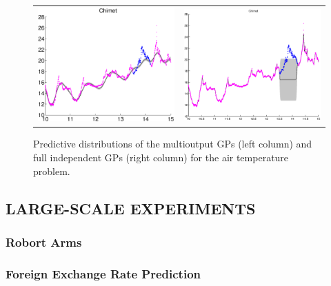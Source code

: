 \begin{figure}
\begin{tabular}{cc}
\includegraphics[scale=0.3]{figures/slfm-weatherChimet.eps} &
\includegraphics[scale=0.3]{figures/weatherChimet.eps}
\end{tabular}
\caption{Predictive distributions of the multioutput GPs (left column) and full independent GPs (right column) for the air temperature problem.}
\label{fig:toy}
\end{figure}

\subsection{LARGE-SCALE EXPERIMENTS}
\subsubsection{Robort Arms}
\subsubsection{Foreign Exchange Rate Prediction}
